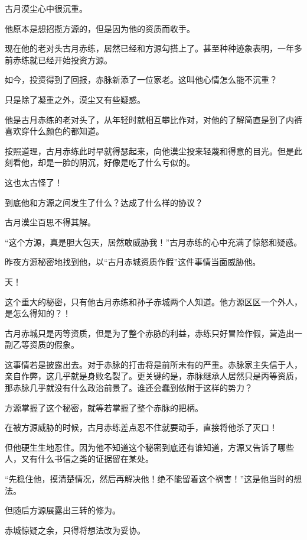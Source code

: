 
\begin{this_body}

古月漠尘心中很沉重。

他原本是想招揽方源的，但是因为他的资质而收手。

现在他的老对头古月赤练，居然已经和方源勾搭上了。甚至种种迹象表明，一年多前赤练就已经开始投资方源。

如今，投资得到了回报，赤脉新添了一位家老。这叫他心情怎么能不沉重？

只是除了凝重之外，漠尘又有些疑惑。

他是古月赤练的老对头了，从年轻时就相互攀比作对，对他的了解简直是到了内裤喜欢穿什么颜色的都知道。

按照道理，古月赤练此时早就得瑟起来，向他漠尘投来轻蔑和得意的目光。但是此刻看他，却是一脸的阴沉，好像是吃了什么亏似的。

这也太古怪了！

到底他和方源之间发生了什么？达成了什么样的协议？

古月漠尘百思不得其解。

“这个方源，真是胆大包天，居然敢威胁我！”古月赤练的心中充满了惊怒和疑惑。

昨夜方源秘密地找到他，以“古月赤城资质作假”这件事情当面威胁他。

天！

这个重大的秘密，只有他古月赤练和孙子赤城两个人知道。他方源区区一个外人，是怎么得知的？！

古月赤城只是丙等资质，但是为了整个赤脉的利益，赤练只好冒险作假，营造出一副乙等资质的假象。

这事情若是披露出去。对于赤脉的打击将是前所未有的严重。赤脉家主失信于人，亲自作弊，这几乎就是身败名裂了。更关键的是，赤脉继承人居然只是丙等资质，那赤脉几乎就没有什么政治前景了。谁还会蠢到依附于这样的势力？

方源掌握了这个秘密，就等若掌握了整个赤脉的把柄。

在被方源威胁的时候，古月赤练差点忍不住就要动手，直接将他杀了灭口！

但他硬生生地忍住。因为他不知道这个秘密到底还有谁知道，方源又告诉了哪些人，又有什么书信之类的证据留在某处。

“先稳住他，摸清楚情况，然后再解决他！绝不能留着这个祸害！”这是他当时的想法。

但随后方源展露出三转的修为。

赤城惊疑之余，只得将想法改为妥协。


\end{this_body}
